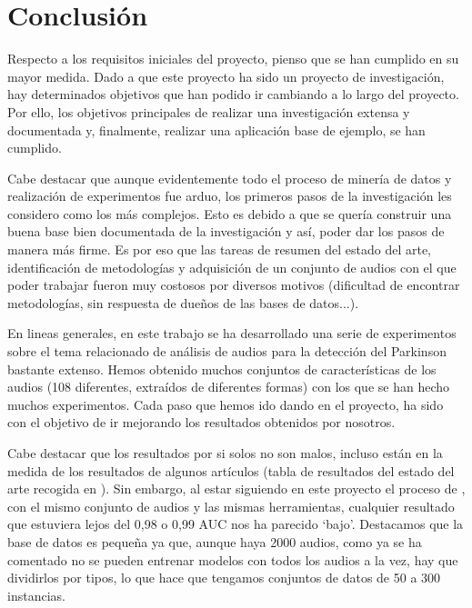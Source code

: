 
\section{Conclusión}
Respecto a los requisitos iniciales del proyecto, pienso que se han cumplido en su mayor medida. Dado a que este proyecto ha sido un proyecto de investigación, hay determinados objetivos que han podido ir cambiando a lo largo del proyecto. Por ello, los objetivos principales de realizar una investigación extensa y documentada y, finalmente, realizar una aplicación base de ejemplo, se han cumplido. 

Cabe destacar que aunque evidentemente todo el proceso de minería de datos y realización de experimentos fue arduo, los primeros pasos de la investigación les considero como los más complejos. Esto es debido a que se quería construir una buena base bien documentada de la investigación y así, poder dar los pasos de manera más firme. Es por eso que las tareas de resumen del estado del arte, identificación de metodologías y adquisición de un conjunto de audios con el que poder trabajar fueron muy costosos por diversos motivos (dificultad de encontrar metodologías, sin respuesta de dueños de las bases de datos...).

En lineas generales, en este trabajo se ha desarrollado una serie de experimentos sobre el tema relacionado de análisis de audios para la detección del Parkinson bastante extenso. Hemos obtenido muchos conjuntos de características de los audios (108 diferentes, extraídos de diferentes formas) con los que se han hecho muchos experimentos. Cada paso que hemos ido dando en el proyecto, ha sido con el objetivo de ir mejorando los resultados obtenidos por nosotros. 

Cabe destacar que los resultados por si solos no son malos, incluso están en la medida de los resultados de algunos artículos (tabla de resultados del estado del arte recogida en \cite{MxLtNovel}). Sin embargo, al estar siguiendo en este proyecto el proceso de \cite{Orz2016}, con el mismo conjunto de audios y las mismas herramientas, cualquier resultado que estuviera lejos del 0,98 o 0,99 AUC nos ha parecido `bajo'. Destacamos que la base de datos es pequeña ya que, aunque haya 2000 audios, como ya se ha comentado no se pueden entrenar modelos con todos los audios a la vez, hay que dividirlos por tipos, lo que hace que tengamos conjuntos de datos de 50 a 300 instancias.

